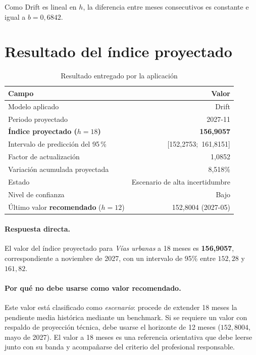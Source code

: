 \documentclass[11pt,letterpaper]{article}
\begin{document}
Como Drift es lineal en \(h\), la diferencia entre meses consecutivos es
constante e igual a \(b=0{,}6842\).

\section{Resultado del índice proyectado}

\begin{table}[H]
\centering
\caption{Resultado entregado por la aplicación}
\begin{tabular}{@{}lr@{}}
\toprule
\textbf{Campo} & \textbf{Valor} \\
\midrule
Modelo aplicado & Drift \\
Periodo proyectado & 2027-11 \\
\textbf{Índice proyectado (\(h=18\))} & \textbf{156{,}9057} \\
Intervalo de predicción del 95\,\% & [152{,}2753;\ 161{,}8151] \\
Factor de actualización & 1{,}0852 \\
Variación acumulada proyectada & 8{,}518\% \\
Estado & Escenario de alta incertidumbre \\
Nivel de confianza & Bajo \\
\midrule
Último valor \textbf{recomendado} (\(h=12\)) & 152{,}8004 (2027-05) \\
\bottomrule
\end{tabular}
\end{table}

\paragraph{Respuesta directa.} El valor del índice proyectado para
\textit{Vías urbanas} a 18 meses es \textbf{156{,}9057}, correspondiente a
noviembre de 2027, con un intervalo de 95\% entre \(152{,}28\) y \(161{,}82\).

\paragraph{Por qué no debe usarse como valor recomendado.} Este valor está
clasificado como \emph{escenario}: procede de extender 18 meses la pendiente
media histórica mediante un benchmark. Si se requiere un valor con respaldo de
proyección técnica, debe usarse el horizonte de 12 meses
(\(152{,}8004\), mayo de 2027). El valor a 18 meses es una referencia
orientativa que debe leerse junto con su banda y acompañarse del criterio del
profesional responsable.
\end{document}
